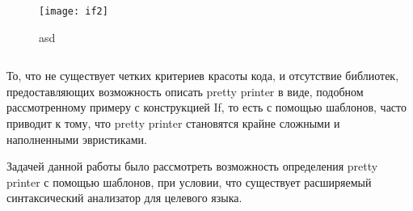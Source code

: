 \begin{figure}[h!]
	\begin{minipage}[b]{0.65\linewidth}
		\centering
		\texttt{[image: if2]}
		\caption{asd}
		\label{fig:ifImage2}
	\end{minipage}
	\hspace{0.5cm}
	\begin{minipage}[b]{0.25\linewidth}
		\centering
		\inputminted{haskell}{codes/ifCode2.hs}
		\caption{}
		\label{fig:ifCode2}
	\end{minipage}
\end{figure}

То, что не существует четких критериев красоты кода, и отсутствие библиотек, предоставляющих возможность описать pretty printer в виде, подобном
рассмотренному примеру с конструкцией If, то есть с помощью шаблонов, часто приводит к тому, что pretty printer становятся крайне сложными и наполненными эвристиками.

Задачей данной работы было рассмотреть возможность определения pretty printer с помощью шаблонов, при условии, что существует расширяемый синтаксический анализатор для целевого языка.